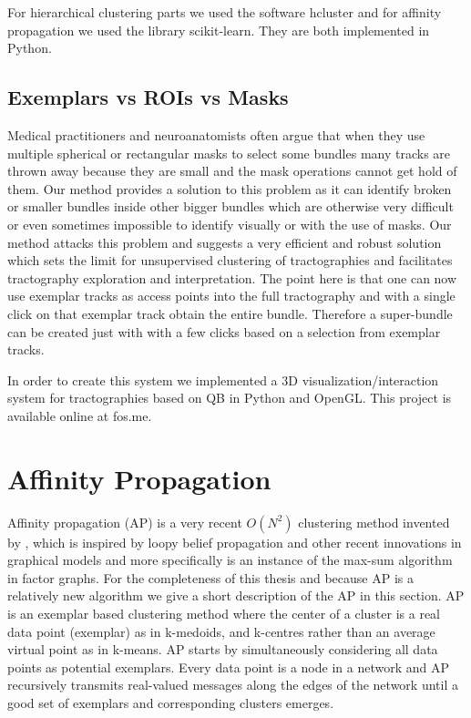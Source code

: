 \documentclass[preprint,authoryear,a4paper,10pt,onecolumn]{elsarticle}
\begin{document}
For hierarchical clustering parts we used the software hcluster and for
affinity propagation we used the library scikit-learn. They are both
implemented in Python.

\subsection{Exemplars vs ROIs vs Masks}

Medical practitioners and neuroanatomists often argue that when they use
multiple spherical or rectangular masks to select some bundles many
tracks are thrown away because they are small and the mask operations
cannot get hold of them. Our method provides a solution to this problem
as it can identify broken or smaller bundles inside other bigger bundles
which are otherwise very difficult or even sometimes impossible to
identify visually or with the use of masks. Our method attacks this
problem and suggests a very efficient and robust solution which sets the
limit for unsupervised clustering of tractographies and facilitates
tractography exploration and interpretation. The point here is that one
can now use exemplar tracks as access points into the full tractography
and with a single click on that exemplar track obtain the entire bundle.
Therefore a super-bundle can be created just with with a few clicks
based on a selection from exemplar tracks.

In order to create this system we implemented a 3D
visualization/interaction system for tractographies based on QB in
Python and OpenGL. This project is available online at fos.me.


\section{Affinity Propagation\label{sub:Affinity-Propagation}}

Affinity propagation (AP) is a very recent $O(N^{2})$ clustering method
invented by \cite{frey2007clustering}, \cite{dueck2009affinity} which is
inspired by loopy belief propagation \cite{pearl1988probabilistic} and
other recent innovations in graphical models and more specifically is an
instance of the max-sum algorithm in factor graphs. For the completeness
of this thesis and because AP is a relatively new algorithm we give a
short description of the AP in this section. AP is an exemplar based
clustering method where the center of a cluster is a real data point
(exemplar) as in k-medoids, and k-centres rather than an average virtual
point as in k-means. AP starts by simultaneously considering all data
points as potential exemplars. Every data point is a node in a network
and AP recursively transmits real-valued messages along the edges of the
network until a good set of exemplars and corresponding clusters
emerges.
\end{document}
